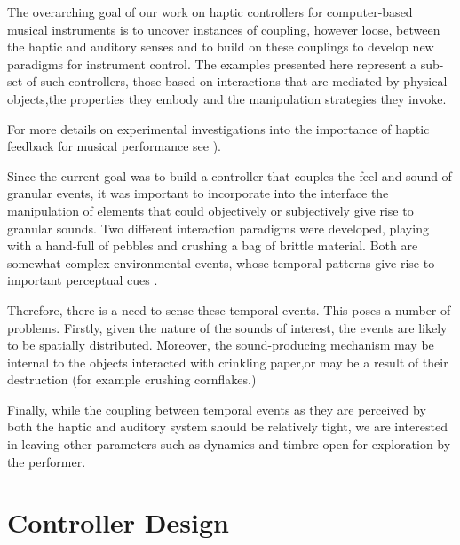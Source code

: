 The overarching goal of our work on haptic controllers for computer-based musical instruments is to uncover instances of coupling, however loose, between the haptic and auditory senses and to build on these couplings to develop new paradigms for instrument control. The examples presented here represent a sub-set of such controllers, those based on interactions that are mediated by physical objects,the properties they embody and the manipulation strategies they invoke.

For more details on experimental investigations into the importance of haptic feedback for musical performance see \cite{OModhrain:2000}).

Since the current goal was to build a controller that couples the feel and sound of granular events, it was  important  to incorporate into the interface the manipulation of elements that could objectively or subjectively give rise to granular sounds.  Two different interaction paradigms were developed, playing with a hand-full of pebbles and crushing a bag of brittle material. Both are somewhat complex environmental events, whose temporal patterns give rise to important perceptual cues \cite{Keller:2001,Warren:1984}.

Therefore, there is a need to sense these temporal events. This poses a number of problems. Firstly, given the nature of the sounds of interest, the events are likely to be spatially distributed. Moreover, the sound-producing mechanism may be internal to the objects interacted with crinkling paper,or may be a result of their destruction (for example crushing cornflakes.)

Finally, while the coupling between temporal events as they are perceived by both the haptic  and auditory system should be relatively tight, we are interested in leaving other parameters such as dynamics and timbre open for exploration by the performer.

\section{Controller Design}

